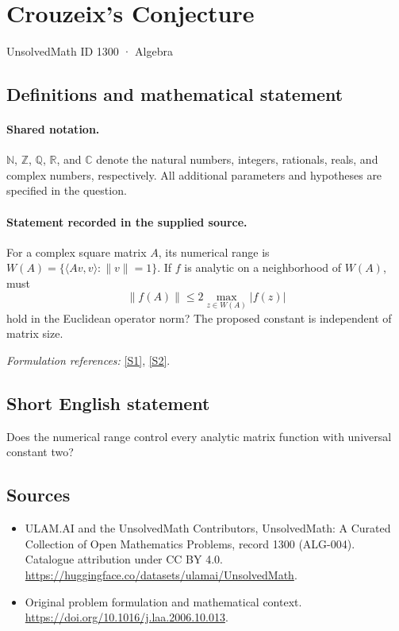 \documentclass[11pt]{article}
\newcommand{\sref}[2]{\hyperlink{source:#1:#2}{[S#2]}}
\begin{document}
\setcounter{section}{1299}
\section{Crouzeix's Conjecture}\label{1300}
{\small UnsolvedMath ID 1300 · Algebra}
\subsection{Definitions and mathematical statement}

\paragraph{Shared notation.}$\mathbb N$, $\mathbb Z$, $\mathbb Q$, $\mathbb R$, and $\mathbb C$ denote the natural numbers, integers, rationals, reals, and complex numbers, respectively. All additional parameters and hypotheses are specified in the question.


\paragraph{Statement recorded in the supplied source.}
For a complex square matrix $A$, its numerical range is $W(A)=\{\langle Av,v\rangle:\|v\|=1\}$. If $f$ is analytic on a neighborhood of $W(A)$, must
\[\|f(A)\|\leq2\max_{z\in W(A)}|f(z)|\]
hold in the Euclidean operator norm? The proposed constant is independent of matrix size.
\par\smallskip\textit{Formulation references:} \sref{1300}{1}, \sref{1300}{2}.
\subsection{Short English statement}
Does the numerical range control every analytic matrix function with universal constant two?
\subsection{Sources}
\begin{itemize}
\item[\hypertarget{source:1300:1}{S1}] ULAM.AI and the UnsolvedMath Contributors, UnsolvedMath: A Curated Collection of Open Mathematics Problems, record 1300 (ALG-004). Catalogue attribution under CC BY 4.0.
\url{https://huggingface.co/datasets/ulamai/UnsolvedMath}.
\item[\hypertarget{source:1300:2}{S2}] Original problem formulation and mathematical context.
\url{https://doi.org/10.1016/j.laa.2006.10.013}.
\end{itemize}
\label{end:1300}
\end{document}
